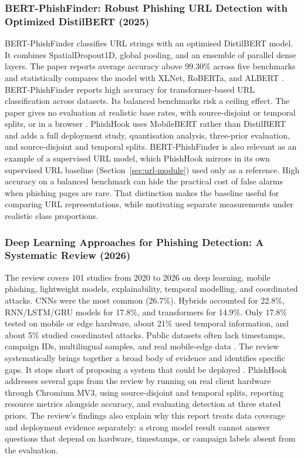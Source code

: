 \documentclass{FastFyp}
\begin{document}
\subsubsection{BERT-PhishFinder: Robust Phishing URL Detection with Optimized DistilBERT (2025)}
BERT-PhishFinder classifies URL strings with an optimised DistilBERT model. It combines SpatialDropout1D, global pooling, and an ensemble of parallel dense layers. The paper reports average accuracy above 99.30\% across five benchmarks and statistically compares the model with XLNet, RoBERTa, and ALBERT \cite{bertphishfinder2025}. BERT-PhishFinder reports high accuracy for transformer-based URL classification across datasets. Its balanced benchmarks risk a ceiling effect. The paper gives no evaluation at realistic base rates, with source-disjoint or temporal splits, or in a browser \cite{bertphishfinder2025}. PhishHook uses MobileBERT rather than DistilBERT and adds a full deployment study, quantisation analysis, three-prior evaluation, and source-disjoint and temporal splits. BERT-PhishFinder is also relevant as an example of a supervised URL model, which PhishHook mirrors in its own supervised URL baseline (Section~\ref{sec:url-module}) used only as a reference. High accuracy on a balanced benchmark can hide the practical cost of false alarms when phishing pages are rare. That distinction makes the baseline useful for comparing URL representations, while motivating separate measurements under realistic class proportions.

\subsubsection{Deep Learning Approaches for Phishing Detection: A Systematic Review (2026)}
The review covers 101 studies from 2020 to 2026 on deep learning, mobile phishing, lightweight models, explainability, temporal modelling, and coordinated attacks. CNNs were the most common (26.7\%). Hybrids accounted for 22.8\%, RNN/LSTM/GRU models for 17.8\%, and transformers for 14.9\%. Only 17.8\% tested on mobile or edge hardware, about 21\% used temporal information, and about 5\% studied coordinated attacks. Public datasets often lack timestamps, campaign IDs, multilingual samples, and real mobile-edge data \cite{dlsurvey2026}. The review systematically brings together a broad body of evidence and identifies specific gaps. It stops short of proposing a system that could be deployed \cite{dlsurvey2026}. PhishHook addresses several gaps from the review by running on real client hardware through Chromium MV3, using source-disjoint and temporal splits, reporting resource metrics alongside accuracy, and evaluating detection at three stated priors. The review's findings also explain why this report treats data coverage and deployment evidence separately: a strong model result cannot answer questions that depend on hardware, timestamps, or campaign labels absent from the evaluation.
\end{document}
